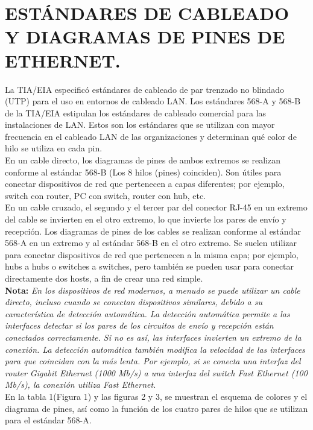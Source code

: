 \documentclass[journal]{IEEEtran}
\begin{document}
\section{ESTÁNDARES DE CABLEADO Y DIAGRAMAS DE PINES DE ETHERNET.}
La TIA/EIA especificó estándares de cableado de par trenzado no blindado (UTP) para el uso en entornos de cableado LAN. Los estándares 568-A y 568-B de la TIA/EIA estipulan los estándares de cableado comercial para las instalaciones de LAN. Estos son los estándares que se utilizan con mayor frecuencia en el cableado LAN de las organizaciones y determinan qué color de hilo se utiliza en cada pin.\\
En un cable directo, los diagramas de pines de ambos extremos se realizan conforme al estándar 568-B (Los 8 hilos (pines) coinciden). Son útiles para conectar dispositivos de red que pertenecen a capas diferentes; por ejemplo, switch con router, PC con switch, router con hub, etc.\\
En un cable cruzado, el segundo y el tercer par del conector RJ-45 en un extremo del cable se invierten en el otro extremo, lo que invierte los pares de envío y recepción. Los diagramas de pines de los cables se realizan conforme al estándar 568-A en un extremo y al estándar 568-B en el otro extremo. Se suelen utilizar para conectar dispositivos de red que pertenecen a la misma capa; por ejemplo, hubs a hubs o switches a switches, pero también se pueden usar para conectar directamente dos hosts, a fin de crear una red simple.\\
\textbf{Nota:} \textit{En los dispositivos de red modernos, a menudo se puede utilizar un cable directo, incluso cuando se conectan dispositivos similares, debido a su característica de detección automática. La detección automática permite a las interfaces detectar si los pares de los circuitos de envío y recepción están conectados correctamente. Si no es así, las interfaces invierten un extremo de la conexión. La detección automática también modifica la velocidad de las interfaces para que coincidan con la más lenta. Por ejemplo, si se conecta una interfaz del router Gigabit Ethernet (1000 Mb/s) a una interfaz del switch Fast Ethernet (100 Mb/s), la conexión utiliza Fast Ethernet.}\\

En la tabla 1(Figura 1) y las figuras 2 y 3, se muestran el esquema de colores y el diagrama de pines, así como la función de los cuatro pares de hilos que se utilizan para el estándar 568-A.
\end{document}
